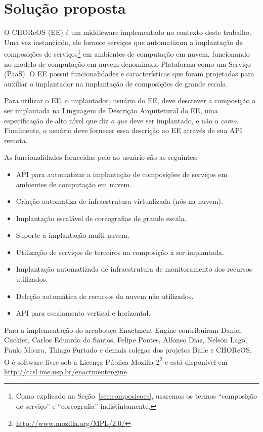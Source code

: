 \chapter{Solução proposta}
\label{cap:solucao}

O CHOReOS \ee (EE) é um middleware implementado no contexto deste trabalho.
Uma vez instanciado, ele fornece serviços que automatizam
a implantação de composições de serviços\footnote{Como explicado na Seção~\ref{sec:composicoes}, usaremos os termos 
``composição de serviço'' e ``coreografia'' indistintamente.} 
em ambientes de computação em nuvem,
funcionando no modelo de computação em nuvem denominado Plataforma como um Serviço (PaaS).
O EE possui funcionalidades e características que foram projetadas para auxiliar o
implantador na implantação de composições de grande escala.

Para utilizar o EE, o implantador, usuário do EE, deve descrever a composição a ser implantada
na Linguagem de Descrição Arquitetural do EE, uma especificação de alto nível que
diz \emph{o que} deve ser implantado, e não o \emph{como}. 
Finalmente, o usuário deve fornecer essa descrição ao EE através de sua API remota.

As funcionalidades fornecidas pelo \ee ao usuário são as seguintes:

\begin{itemize}
\item API para automatizar a implantação de composições de serviços em ambientes de computação em nuvem.
\item Criação automatiza de infraestrutura virtualizada (nós na nuvem).
\item Implantação escalável de coreografias de grande escala.
\item Suporte a implantação multi-nuvem.
\item Utilização de serviços de terceiros na composição a ser implantada.
\item Implantação automatizada de infraestrutura de monitoramento dos recursos utilizados.
\item Deleção automática de recursos da nuvem não utilizados.
\item API para escalamento vertical e horizontal.
\end{itemize}

Para a implementação do arcabouço Enactment Engine contribuíram Daniel Cuckier, Carlos Eduardo do Santos, Felipe Pontes, Alfonso Diaz, Nelson Lago, Paulo Moura, Thiago Furtado e demais colegas dos projetos Baile e CHOReOS. O \ee é software livre 
sob a Licença Pública Mozilla 2\footnote{\url{http://www.mozilla.org/MPL/2.0/}} 
e está disponível em \url{http://ccsl.ime.usp.br/enactmentengine}. 

